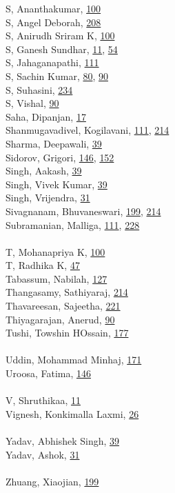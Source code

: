 \documentclass[11pt,oneside]{book}
\begin{document}
\begin{multicols}{2}
S, Ananthakumar, \hyperlink{page.100}{100}\\
S, Angel Deborah, \hyperlink{page.208}{208}\\
S, Anirudh Sriram K, \hyperlink{page.100}{100}\\
S, Ganesh Sundhar, \hyperlink{page.11}{11}, \hyperlink{page.54}{54}\\
S, Jahaganapathi, \hyperlink{page.111}{111}\\
S, Sachin Kumar, \hyperlink{page.80}{80}, \hyperlink{page.90}{90}\\
S, Suhasini, \hyperlink{page.234}{234}\\
S, Vishal, \hyperlink{page.90}{90}\\
Saha, Dipanjan, \hyperlink{page.17}{17}\\
Shanmugavadivel, Kogilavani, \hyperlink{page.111}{111}, \hyperlink{page.214}{214}\\
Sharma, Deepawali, \hyperlink{page.39}{39}\\
Sidorov, Grigori, \hyperlink{page.146}{146}, \hyperlink{page.152}{152}\\
Singh, Aakash, \hyperlink{page.39}{39}\\
Singh, Vivek Kumar, \hyperlink{page.39}{39}\\
Singh, Vrijendra, \hyperlink{page.31}{31}\\
Sivagnanam, Bhuvaneswari, \hyperlink{page.199}{199}, \hyperlink{page.214}{214}\\
Subramanian, Malliga, \hyperlink{page.111}{111}, \hyperlink{page.228}{228}\\
\\ %
T, Mohanapriya K, \hyperlink{page.100}{100}\\
T, Radhika K, \hyperlink{page.47}{47}\\
Tabassum, Nabilah, \hyperlink{page.127}{127}\\
Thangasamy, Sathiyaraj, \hyperlink{page.214}{214}\\
Thavareesan, Sajeetha, \hyperlink{page.221}{221}\\
Thiyagarajan, Anerud, \hyperlink{page.90}{90}\\
Tushi, Towshin HOssain, \hyperlink{page.177}{177}\\
\\ %
Uddin, Mohammad Minhaj, \hyperlink{page.171}{171}\\
Uroosa, Fatima, \hyperlink{page.146}{146}\\
\\ %
V, Shruthikaa, \hyperlink{page.11}{11}\\
Vignesh, Konkimalla Laxmi, \hyperlink{page.26}{26}\\
\\ %
Yadav, Abhishek Singh, \hyperlink{page.39}{39}\\
Yadav, Ashok, \hyperlink{page.31}{31}\\
\\ %
Zhuang, Xiaojian, \hyperlink{page.199}{199}\\
\\ %
\end{multicols}
\end{document}
